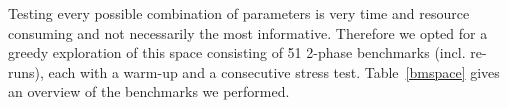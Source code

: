 Testing every possible combination of parameters is very time and resource consuming and not necessarily the most informative. Therefore we opted for a greedy exploration of this space consisting of 51 2-phase  benchmarks (incl. re-runs), each with a warm-up and a consecutive stress test. Table~\ref{bmspace} gives an overview of the benchmarks we performed.


